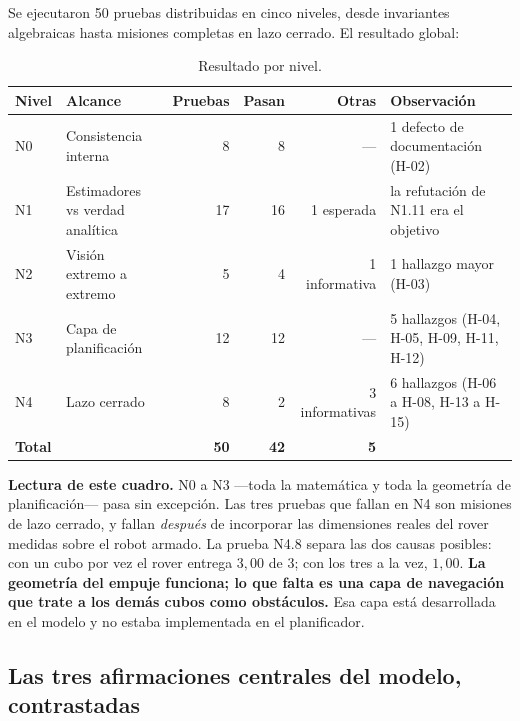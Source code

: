 \documentclass[11pt,a4paper]{article}
\begin{document}
Se ejecutaron 50 pruebas distribuidas en cinco niveles, desde invariantes algebraicas
hasta misiones completas en lazo cerrado. El resultado global:

\begin{table}[htbp]
\centering
\small
\caption{Resultado por nivel.}
\begin{tabular}{llrrrl}
\toprule
Nivel & Alcance & Pruebas & Pasan & Otras & Observación \\
\midrule
N0 & Consistencia interna & 8 & 8 & --- & 1 defecto de documentación (H-02) \\
N1 & Estimadores vs verdad analítica & 17 & 16 & 1 esperada & la refutación de N1.11 era el objetivo \\
N2 & Visión extremo a extremo & 5 & 4 & 1 informativa & 1 hallazgo mayor (H-03) \\
N3 & Capa de planificación & 12 & 12 & --- & 5 hallazgos (H-04, H-05, H-09, H-11, H-12) \\
N4 & Lazo cerrado & 8 & 2 & 3 informativas & 6 hallazgos (H-06 a H-08, H-13 a H-15) \\
\midrule
\multicolumn{2}{l}{\textbf{Total}} & \textbf{50} & \textbf{42} & \textbf{5} & \\
\bottomrule
\end{tabular}
\end{table}

\begin{tcolorbox}[colback=black!5,colframe=black!65,boxrule=0.7pt,arc=1pt]
\textbf{Lectura de este cuadro.} N0 a N3 ---toda la matemática y toda la geometría de
planificación--- pasa sin excepción. Las tres pruebas que fallan en N4 son misiones de
lazo cerrado, y fallan \emph{después} de incorporar las dimensiones reales del rover
medidas sobre el robot armado. La prueba N4.8 separa las dos causas posibles: con un cubo
por vez el rover entrega $3{,}00$ de $3$; con los tres a la vez, $1{,}00$. \textbf{La
geometría del empuje funciona; lo que falta es una capa de navegación que trate a los
demás cubos como obstáculos.} Esa capa está desarrollada en el modelo y no estaba
implementada en el planificador.
\end{tcolorbox}

\subsection{Las tres afirmaciones centrales del modelo, contrastadas}
\end{document}
